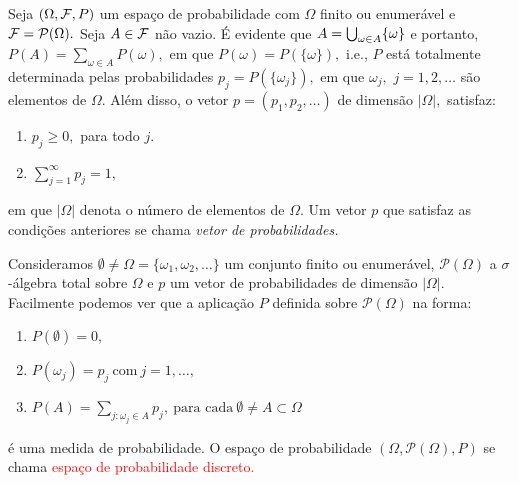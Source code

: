 \begin{frame}

\begin{defi} Seja  $(\Omega, {\cal F}, P)$ um espaço de probabilidade com $\Omega$ finito ou
enumerável e  ${\cal F}=\mathcal{P}(\Omega ).$ Seja $A \in {\cal F}$ não vazio. É
evidente que $A=\bigcup_{\omega\in A}\{{\omega}\}$ e portanto, $P(A) = \sum_{\omega\in
	A}{P(\omega)},$ em que $P(\omega)=P(\{\omega\}),$ i.e., $P$ está totalmente
determinada pelas probabilidades  $p_j=P(\{\omega_j\}),$ em que $\omega_j,$ $j=1,2,\ldots$ são
elementos de $\Omega.$ Além disso, o vetor $p=(p_1, p_2, \ldots)$ de dimensão 
$|\Omega|,$  satisfaz: 

\begin{enumerate}
	\item $p_j\geq 0,$ para todo $j.$
	\item  $\sum_{j=1}^\infty p_j=1,$ 
\end{enumerate}
em que $|\Omega|$ denota o número de elementos de $\Omega.$ Um vetor $p$ que satisfaz
as condições anteriores se chama \emph{ vetor de probabilidades.}
\end{defi}


\begin{defi} Consideramos $\emptyset\neq\Omega=\{\omega_1,\omega_2,\ldots\}$ um conjunto finito ou
enumerável, $ \mathcal{P}(\Omega )$  a $\sigma$-álgebra total sobre $\Omega$ e
$p$ um vetor de probabilidades de dimensão $|\Omega|.$ Facilmente podemos ver
que a aplicação $P$ definida sobre  $\mathcal{P}(\Omega )$ na forma:
\begin{enumerate}
	\item $P(\emptyset)=0,$ 
	\item $P(\omega_j) =p_j \ \text{com} \  j=1, \ldots ,$
	\item $P(A)  =\sum_{j:\omega_j \in A}p_j, \ \text{para cada} \  \emptyset\neq A \subset \Omega$
\end{enumerate}
é uma medida de probabilidade. O espaço de probabilidade $(\Omega, \mathcal{P}(\Omega ), P)$ se
chama \textcolor{red}{espaço de probabilidade discreto.}
\end{defi}
\end{frame}

